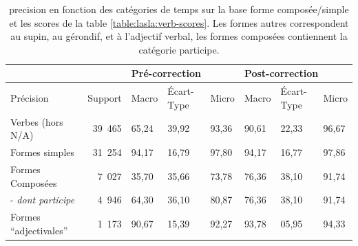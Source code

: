 
\begin{table}[h]
\centering
\begin{tabular}{@{}l|r|lll|lll@{}}
\toprule
                                &         & \multicolumn{3}{l}{Pré-correction} & \multicolumn{3}{l}{Post-correction} \\ \midrule
Précision                       & Support      & Macro    & Écart-Type   & Micro    & Macro     & Écart-Type   & Micro    \\ \midrule
Verbes (hors N/A)               & 39~465        & 65,24   & 39,92        & 93,36    & 90,61     & 22,33        & 96,67   \\
Formes simples                  & 31~254        & 94,17   & 16,79        & 97,80    & 94,17     & 16,77        & 97,86   \\
Formes Composées                & 7~027         & 35,70   & 35,66        & 73,78    & 76,36     & 38,10        & 91,74   \\
- \textit{dont participe}       & 4~946         & 64,30   & 36,10        & 80,87    & 76,36     & 38,10        & 91,74   \\
Formes “adjectivales”           & 1~173         & 90,67   & 15,39        & 92,27    & 93,78     & 05,95        & 94,33   \\ \bottomrule
\end{tabular}
\caption{\Gls{precision} en fonction des catégories de temps sur la base forme composée/simple et les scores de la table \ref{table:lasla:verb-scores}. Les formes autres correspondent au supin, au gérondif, et à l'adjectif verbal, les formes composées contiennent la catégorie participe.}
\label{table:lasla:formes-simples-formes-composees}
\end{table}


